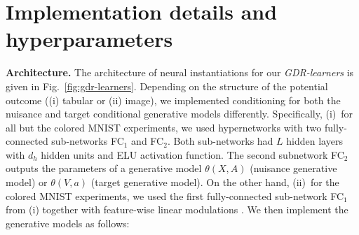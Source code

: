 \documentclass[dvipsnames]{article} %
\newcommand{\GDRlearners}{\emph{GDR-learners}\xspace}
\begin{document}
    
\newpage
\section{Implementation details and hyperparameters} \label{app:implementation}
\textbf{Architecture.} The architecture of neural instantiations for our \GDRlearners is given in Fig.~\ref{fig:gdr-learners}. Depending on the structure of the potential outcome ((i) tabular or (ii) image), we implemented conditioning for both the nuisance and target conditional generative models differently. Specifically, (i)~for all but the colored MNIST experiments, we used hypernetworks \citep{ha2017hypernetworks} with two fully-connected sub-networks FC$_1$ and FC$_2$. Both sub-networks had $L$ hidden layers with $ d_h$ hidden units and ELU activation function. The second subnetwork FC$_2$ outputs the parameters of a generative model $\theta(X, A)$ (nuisance generative model) or $\theta(V, a)$ (target generative model). {On the other hand, (ii)~for the colored MNIST experiments, we used the first fully-connected sub-network FC$_1$ from (i) together with feature-wise linear modulations \citep{perez2018film}.} We then implement the generative models as follows:
\end{document}
